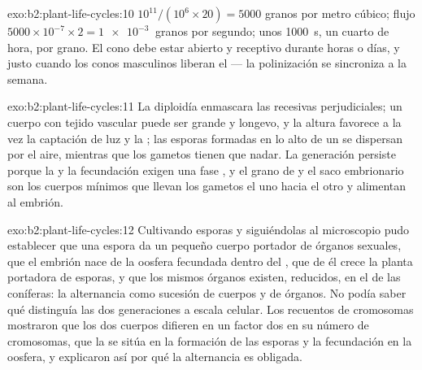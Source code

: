 \begin{solution}{exo:b2:plant-life-cycles:10}
$10^{11}/(10^{6}\times 20) = \num{5000}$ granos por metro cúbico; flujo
$5000\times 10^{-7}\times 2 = \qty{1e-3}{}$ granos por segundo; unos
\qty{1000}{s}, un cuarto de hora, por grano. El cono debe estar abierto y
receptivo durante horas o días, y justo cuando los conos masculinos
liberan el  --- la polinización se sincroniza a la semana.
\end{solution}

\begin{solution}{exo:b2:plant-life-cycles:11}
La diploidía enmascara las  recesivas perjudiciales; un cuerpo
 con tejido vascular puede ser grande y longevo, y la altura
favorece a la vez la captación de luz y la ; las
esporas formadas en lo alto de un  se dispersan por el aire,
mientras que los gametos tienen que nadar. La generación 
persiste porque la  y la fecundación exigen una fase , y
el grano de  y el saco embrionario son los cuerpos mínimos que
llevan los gametos el uno hacia el otro y alimentan al embrión.
\end{solution}

\begin{solution}{exo:b2:plant-life-cycles:12}
Cultivando esporas y siguiéndolas al microscopio pudo establecer que una
espora da un pequeño cuerpo portador de órganos sexuales, que el embrión
nace de la oosfera fecundada dentro del , que de él crece la
planta portadora de esporas, y que los mismos órganos existen, reducidos,
en el  de las coníferas: la alternancia como sucesión de cuerpos y
de órganos. No podía saber qué distinguía las dos generaciones a escala
celular. Los recuentos de cromosomas mostraron que los dos cuerpos
difieren en un factor dos en su número de cromosomas, que la  se
sitúa en la formación de las esporas y la fecundación en la oosfera, y
explicaron así por qué la alternancia es obligada.
\end{solution}


